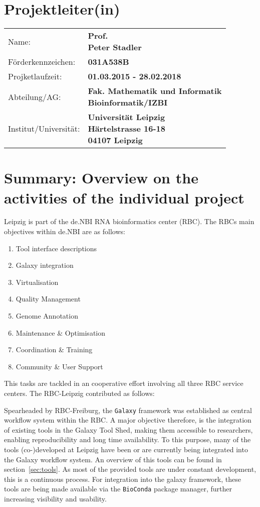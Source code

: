 \documentclass{article}
\begin{document}
\section*{Projektleiter(in)}

{
\def\arraystretch{2.5}
\begin{tabular}[t]{p{7cm}@{}>{\bf}l}
Name: & 
\pbox[t]{7cm}{Prof.\\ 
Peter Stadler}\\
Förderkennzeichen: & 031A538B\\
Projketlaufzeit: & 01.03.2015 - 28.02.2018\\
Abteilung/AG: & 
\pbox[t]{7cm}{Fak. Mathematik und Informatik\\
  Bioinformatik/IZBI}\\
Institut/Universität: &
\pbox[t]{7cm}{Universität Leipzig\\
Härtelstrasse 16-18\\
04107 Leipzig}\\
\end{tabular}
}

\pagebreak

\section*{Summary: Overview on the activities of the individual project}
\label{sec:summary}
Leipzig is part of the de.NBI RNA bioinformatics center (RBC). 
The RBCs main objectives within de.NBI are as follows:

\begin{enumerate}
\item Tool interface descriptions
\item Galaxy integration
\item Virtualisation
\item Quality Management
\item Genome Annotation
\item Maintenance \& Optimisation
\item Coordination \& Training
\item Community \& User Support
\end{enumerate}

This tasks are tackled in an cooperative effort involving all three
RBC service centers.
The RBC-Leipzig contributed as follows:

Spearheaded by RBC-Freiburg, the \texttt{Galaxy} framework was
established as central workflow system within the RBC.  A major
objective therefore, is the integration of existing tools in the
Galaxy Tool Shed, making them accessible to researchers, enabling
reproducibility and long time availability. To this purpose, many of
the tools (co-)developed at Leipzig have been or are currently being
integrated into the Galaxy workflow system. An overview of this tools
can be found in section~\ref{sec:tools}. As most of the provided tools
are under constant development, this is a continuous process. For
integration into the galaxy framework, these tools are being made
available via the \texttt{BioConda} package manager, further
increasing visibility and usability.
\end{document}
